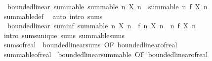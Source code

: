 \begin{isabellebody}
\isamarkupfalse%
\ {\isacharparenleft}{\kern0pt}\ bounded{\isacharunderscore}{\kern0pt}linear{\isacharparenright}{\kern0pt}\ summable{\isacharcolon}{\kern0pt}\ {\isachardoublequoteopen}summable\ {\isacharparenleft}{\kern0pt}{\isasymlambda}n{\isachardot}{\kern0pt}\ X\ n{\isacharparenright}{\kern0pt}\ {\isasymLongrightarrow}\ summable\ {\isacharparenleft}{\kern0pt}{\isasymlambda}n{\isachardot}{\kern0pt}\ f\ {\isacharparenleft}{\kern0pt}X\ n{\isacharparenright}{\kern0pt}{\isacharparenright}{\kern0pt}{\isachardoublequoteclose}\isanewline
%
\isadelimproof
\ \ %
\endisadelimproof
%
\isatagproof
{}\isamarkupfalse%
\ summable{\isacharunderscore}{\kern0pt}def\ \isamarkupfalse%
\ {\isacharparenleft}{\kern0pt}auto\ intro{\isacharcolon}{\kern0pt}\ sums{\isacharparenright}{\kern0pt}%
\endisatagproof
{\isafoldproof}%
%
\isadelimproof
\isanewline
%
\endisadelimproof
\isanewline
{}\isamarkupfalse%
\ {\isacharparenleft}{\kern0pt}\ bounded{\isacharunderscore}{\kern0pt}linear{\isacharparenright}{\kern0pt}\ suminf{\isacharcolon}{\kern0pt}\ {\isachardoublequoteopen}summable\ {\isacharparenleft}{\kern0pt}{\isasymlambda}n{\isachardot}{\kern0pt}\ X\ n{\isacharparenright}{\kern0pt}\ {\isasymLongrightarrow}\ f\ {\isacharparenleft}{\kern0pt}{\isasymSum}n{\isachardot}{\kern0pt}\ X\ n{\isacharparenright}{\kern0pt}\ {\isacharequal}{\kern0pt}\ {\isacharparenleft}{\kern0pt}{\isasymSum}n{\isachardot}{\kern0pt}\ f\ {\isacharparenleft}{\kern0pt}X\ n{\isacharparenright}{\kern0pt}{\isacharparenright}{\kern0pt}{\isachardoublequoteclose}\isanewline
%
\isadelimproof
\ \ %
\endisadelimproof
%
\isatagproof
{}\isamarkupfalse%
\ {\isacharparenleft}{\kern0pt}intro\ sums{\isacharunderscore}{\kern0pt}unique\ sums\ summable{\isacharunderscore}{\kern0pt}sums{\isacharparenright}{\kern0pt}%
\endisatagproof
{\isafoldproof}%
%
\isadelimproof
\isanewline
%
\endisadelimproof
\isanewline
{}\isamarkupfalse%
\ sums{\isacharunderscore}{\kern0pt}of{\isacharunderscore}{\kern0pt}real\ {\isacharequal}{\kern0pt}\ bounded{\isacharunderscore}{\kern0pt}linear{\isachardot}{\kern0pt}sums\ {\isacharbrackleft}{\kern0pt}OF\ bounded{\isacharunderscore}{\kern0pt}linear{\isacharunderscore}{\kern0pt}of{\isacharunderscore}{\kern0pt}real{\isacharbrackright}{\kern0pt}\isanewline
{}\isamarkupfalse%
\ summable{\isacharunderscore}{\kern0pt}of{\isacharunderscore}{\kern0pt}real\ {\isacharequal}{\kern0pt}\ bounded{\isacharunderscore}{\kern0pt}linear{\isachardot}{\kern0pt}summable\ {\isacharbrackleft}{\kern0pt}OF\ bounded{\isacharunderscore}{\kern0pt}linear{\isacharunderscore}{\kern0pt}of{\isacharunderscore}{\kern0pt}real{\isacharbrackright}{\kern0pt}\isanewline

\end{isabellebody}
